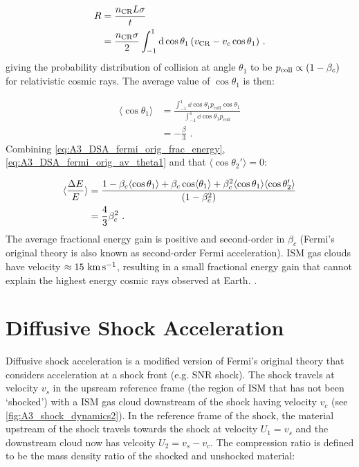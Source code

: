 \begin{equation}
    \begin{aligned}
        R&=\frac{n_\text{CR}L\sigma}{t} \\
        &=\frac{n_\text{CR}\sigma}{2}\int_{-1}^1\dd{\cos\theta_1}\qty(v_\text{CR}-v_c\cos\theta_1) \text{ .}
    \end{aligned}
\end{equation}
\noindent giving the probability distribution of collision at angle $\theta_1$ to be $p_\text{coll}\propto \qty(1-\beta_c)$ for relativistic cosmic rays. The average value of $\cos\theta_1$ is then:

\begin{equation}
    \begin{aligned}
        \langle \cos\theta_1\rangle &=\frac{\int_{-1}^1\dd{\cos\theta_1}p_\text{coll}\cos\theta_1}{\int_{-1}^1\dd{\cos\theta_1}p_\text{coll}} \\
        &=-\frac{\beta}{3} \text{ .}
    \end{aligned} \label{eq:A3_DSA_fermi_orig_av_theta1}
\end{equation} 
\noindent Combining \autoref{eq:A3_DSA_fermi_orig_frac_energy}, \autoref{eq:A3_DSA_fermi_orig_av_theta1} and that $\langle \cos\theta_2' \rangle=0$:

\begin{equation}
    \begin{aligned}
        \langle \frac{\Delta E}{E} \rangle&=\frac{1-\beta_c\langle\cos\theta_1\rangle+\beta_c\cos\langle\theta_1\rangle+\beta_c^2\langle\cos\theta_1\rangle\langle\cos\theta_2'\rangle}{\qty(1-\beta_c^2)} \\
        &= \frac{4}{3}\beta_c^2 \text{ .}
    \end{aligned}
\end{equation}
\noindent The average fractional energy gain is positive and second-order in $\beta_c$ (Fermi's original theory is also known as second-order Fermi acceleration). ISM gas clouds have velocity $\approx 15~\si{\kilo\meter\per\second}$, resulting in a small fractional energy gain that cannot explain the highest energy cosmic rays observed at Earth. \citep{1949PhRv...75.1169F}. 

\section{Diffusive Shock Acceleration}

Diffusive shock acceleration is a modified version of Fermi's original theory that considers acceleration at a shock front (e.g. SNR shock). The shock travels at velocity $v_s$ in the upsream reference frame (the region of ISM that has not been `shocked') with a ISM gas cloud downstream of the shock having velocity $v_c$ (see \autoref{fig:A3_shock_dynamics2}). In the reference frame of the shock, the material upstream of the shock travels towards the shock at velocity $U_1=v_s$ and the downstream cloud now has velcoity $U_2=v_s-v_c$. The compression ratio is defined to be the mass density ratio of the shocked and unshocked material:

